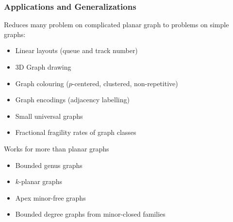 \documentclass[xcolor=dvipsnames]{beamer}
\begin{document}
\begin{frame}
\frametitle{Applications and Generalizations}

Reduces many problem on complicated planar graph to problems on simple graphs:
\begin{itemize}
    \item Linear layouts (queue and track number)
    \item 3D Graph drawing
    \item Graph colouring ($p$-centered, clustered, non-repetitive)
    \item Graph encodings (adjacency labelling)
    \item Small universal graphs
    \item Fractional fragility rates of graph classes
\end{itemize}
Works for more than planar graphs
\begin{itemize}
    \item Bounded genus graphs
    \item $k$-planar graphs
    \item Apex minor-free graphs
    \item Bounded degree graphs from minor-closed families
\end{itemize}
\end{frame}
\end{document}
